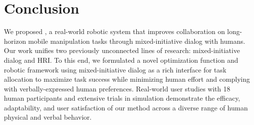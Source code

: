 \section{Conclusion}
\label{sec:conclusion}

We proposed \ours{}, a real-world robotic system that improves collaboration on long-horizon mobile manipulation tasks through mixed-initiative dialog with humans.
Our work unifies two previously unconnected lines of research: mixed-initiative dialog and HRI.
To this end, we formulated a novel optimization function and robotic framework using mixed-initiative dialog as a rich interface for task allocation to maximize task success while minimizing human effort and complying with verbally-expressed human preferences.
Real-world user studies with 18 human participants and extensive trials in simulation demonstrate the efficacy, adaptability, and user satisfaction of our method across a diverse range of human physical and verbal behavior.